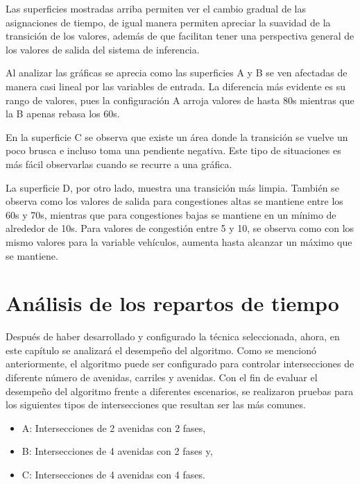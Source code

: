 Las superficies mostradas arriba permiten ver el cambio gradual de las asignaciones de tiempo, de igual manera permiten apreciar la suavidad de la transición de los valores, además de que facilitan tener una perspectiva general de los valores de salida del sistema de inferencia.

Al analizar las gráficas se aprecia como las superficies A y B se ven afectadas de manera casi lineal por las variables de entrada. La diferencia más evidente es su rango de valores, pues la configuración A arroja valores de hasta 80s mientras que la B apenas rebasa los 60s.

En la superficie C se observa que existe un área donde la transición se vuelve un poco brusca e incluso toma una pendiente negativa. Este tipo de situaciones es más fácil observarlas cuando se recurre a una gráfica.

La superficie D, por otro lado, muestra una transición más limpia. También se observa como los valores de salida para congestiones altas se mantiene entre los 60s y 70s, mientras que para congestiones bajas se mantiene en un mínimo de alrededor de 10s.
Para valores de congestión entre 5 y 10, se observa como con los mismo valores para la variable vehículos, aumenta hasta alcanzar un máximo que se mantiene.

\section{Análisis de los repartos de tiempo}
Después de haber desarrollado y configurado la técnica seleccionada, ahora, en este capítulo se analizará el desempeño del algoritmo. Como se mencionó anteriormente, el algoritmo puede ser configurado para controlar intersecciones de diferente número de avenidas, carriles y avenidas. Con el fin de evaluar el desempeño del algoritmo frente a diferentes escenarios, se realizaron pruebas para los siguientes tipos de intersecciones que resultan ser las más comunes. 

{\setlength{\baselineskip}{0.5\baselineskip}
\begin{itemize}
	\item A: Intersecciones de 2 avenidas con 2 fases,
	\item B: Intersecciones de 4 avenidas con 2 fases y,
	\item C: Intersecciones de 4 avenidas con 4 fases.
\end{itemize}}

